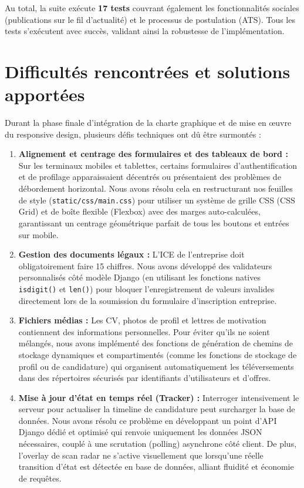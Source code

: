 Au total, la suite exécute \textbf{17 tests} couvrant également les fonctionnalités sociales (publications sur le fil d'actualité) et le processus de postulation (ATS). Tous les tests s'exécutent avec succès, validant ainsi la robustesse de l'implémentation.

\section{Difficultés rencontrées et solutions apportées}
Durant la phase finale d'intégration de la charte graphique et de mise en œuvre du responsive design, plusieurs défis techniques ont dû être surmontés :
\begin{enumerate}
    \item \textbf{Alignement et centrage des formulaires et des tableaux de bord :} Sur les terminaux mobiles et tablettes, certains formulaires d'authentification et de profilage apparaissaient décentrés ou présentaient des problèmes de débordement horizontal. Nous avons résolu cela en restructurant nos feuilles de style (\texttt{static/css/main.css}) pour utiliser un système de grille CSS (CSS Grid) et de boîte flexible (Flexbox) avec des marges auto-calculées, garantissant un centrage géométrique parfait de tous les boutons et entrées sur mobile.
    \item \textbf{Gestion des documents légaux :} L'ICE de l'entreprise doit obligatoirement faire 15 chiffres. Nous avons développé des validateurs personnalisés côté modèle Django (en utilisant les fonctions natives \texttt{isdigit()} et \texttt{len()}) pour bloquer l'enregistrement de valeurs invalides directement lors de la soumission du formulaire d'inscription entreprise.
    \item \textbf{Fichiers médias :} Les CV, photos de profil et lettres de motivation contiennent des informations personnelles. Pour éviter qu'ils ne soient mélangés, nous avons implémenté des fonctions de génération de chemins de stockage dynamiques et compartimentés (comme les fonctions de stockage de profil ou de candidature) qui organisent automatiquement les téléversements dans des répertoires sécurisés par identifiants d'utilisateurs et d'offres.
    \item \textbf{Mise à jour d'état en temps réel (Tracker) :} Interroger intensivement le serveur pour actualiser la timeline de candidature peut surcharger la base de données. Nous avons résolu ce problème en développant un point d'API Django dédié et optimisé qui renvoie uniquement les données JSON nécessaires, couplé à une scrutation (polling) asynchrone côté client. De plus, l'overlay de scan radar ne s'active visuellement que lorsqu'une réelle transition d'état est détectée en base de données, alliant fluidité et économie de requêtes.

\end{enumerate}

